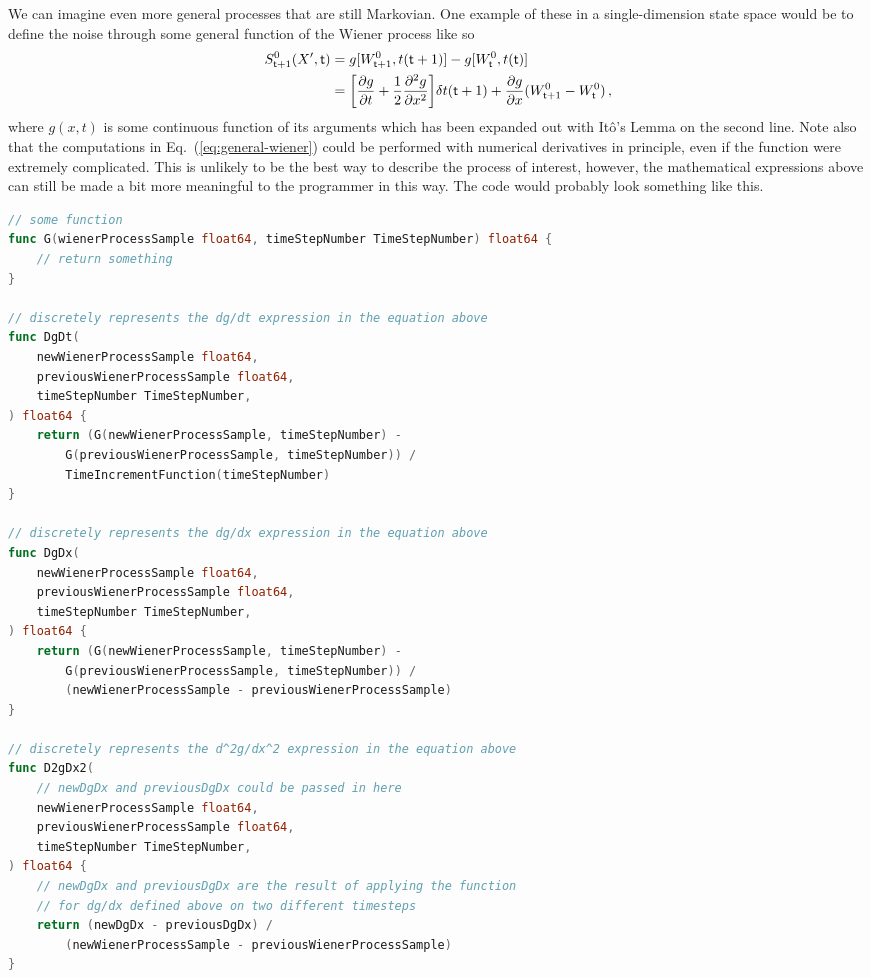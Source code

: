 \documentclass{book}
\begin{document}
We can imagine even more general processes that are still Markovian. One example of these in a single-dimension state space would be to define the noise through some general function of the Wiener process like so
\begin{align}
S^0_{{\sf t}+1}(X',{\sf t}) &= g[W^0_{{\sf t}+1},t({\sf t}+1)]-g[W^0_{\sf t}, t({\sf t})] \\
&= \bigg[ \frac{\partial g}{\partial t} + \frac{1}{2}\frac{\partial^2 g}{\partial x^2} \bigg] \delta t ({\sf t}+1) + \frac{\partial g}{\partial x} (W^0_{{\sf t}+1}-W^0_{\sf t}) \label{eq:general-wiener}\,,
\end{align}
where $g(x,t)$ is some continuous function of its arguments which has been expanded out with Itô's Lemma on the second line. Note also that the computations in Eq.~(\ref{eq:general-wiener}) could be performed with numerical derivatives in principle, even if the function were extremely complicated. This is unlikely to be the best way to describe the process of interest, however, the mathematical expressions above can still be made a bit more meaningful to the programmer in this way. The code would probably look something like this.

\begin{lstlisting}[language=Go]
// some function
func G(wienerProcessSample float64, timeStepNumber TimeStepNumber) float64 {
    // return something
}

// discretely represents the dg/dt expression in the equation above
func DgDt(
    newWienerProcessSample float64, 
    previousWienerProcessSample float64,
    timeStepNumber TimeStepNumber,
) float64 {
    return (G(newWienerProcessSample, timeStepNumber) - 
        G(previousWienerProcessSample, timeStepNumber)) / 
        TimeIncrementFunction(timeStepNumber)
}

// discretely represents the dg/dx expression in the equation above
func DgDx(
    newWienerProcessSample float64, 
    previousWienerProcessSample float64,
    timeStepNumber TimeStepNumber,
) float64 {
    return (G(newWienerProcessSample, timeStepNumber) - 
        G(previousWienerProcessSample, timeStepNumber)) / 
        (newWienerProcessSample - previousWienerProcessSample)
}

// discretely represents the d^2g/dx^2 expression in the equation above
func D2gDx2(
    // newDgDx and previousDgDx could be passed in here
    newWienerProcessSample float64, 
    previousWienerProcessSample float64,
    timeStepNumber TimeStepNumber,
) float64 {
    // newDgDx and previousDgDx are the result of applying the function 
    // for dg/dx defined above on two different timesteps
    return (newDgDx - previousDgDx) / 
        (newWienerProcessSample - previousWienerProcessSample)
}
\end{lstlisting}
\end{document}
